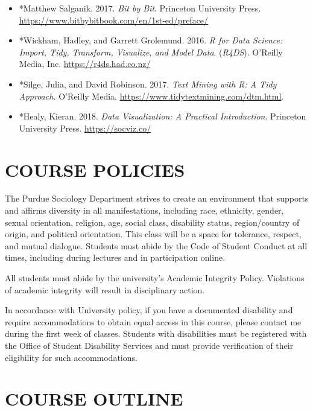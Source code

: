 \documentclass[
  10pt,
]{article}
\providecommand{\tightlist}{%
  \setlength{\itemsep}{0pt}\setlength{\parskip}{0pt}}
\begin{document}
\begin{itemize}
\tightlist
\item
  *Matthew Salganik. 2017. \emph{Bit by Bit}. Princeton University
  Press. \url{https://www.bitbybitbook.com/en/1st-ed/preface/}
\item
  *Wickham, Hadley, and Garrett Grolemund. 2016. \emph{R for Data
  Science: Import, Tidy, Transform, Visualize, and Model Data}.
  (\emph{R4DS}). O'Reilly Media, Inc. \url{https://r4ds.had.co.nz/}
\item
  *Silge, Julia, and David Robinson. 2017. \emph{Text Mining with R: A
  Tidy Approach.} O'Reilly Media.
  \url{https://www.tidytextmining.com/dtm.html}.
\item
  *Healy, Kieran. 2018. \emph{Data Visualization: A Practical
  Introduction}. Princeton University Press. \url{https://socviz.co/}
\end{itemize}

\hypertarget{course-policies}{%
\section{COURSE POLICIES}\label{course-policies}}

The Purdue Sociology Department strives to create an environment that
supports and affirms diversity in all manifestations, including race,
ethnicity, gender, sexual orientation, religion, age, social class,
disability status, region/country of origin, and political orientation.
This class will be a space for tolerance, respect, and mutual dialogue.
Students must abide by the Code of Student Conduct at all times,
including during lectures and in participation online.

All students must abide by the university's Academic Integrity Policy.
Violations of academic integrity will result in disciplinary action.

In accordance with University policy, if you have a documented
disability and require accommodations to obtain equal access in this
course, please contact me during the first week of classes. Students
with disabilities must be registered with the Office of Student
Disability Services and must provide verification of their eligibility
for such accommodations.

\hypertarget{course-outline}{%
\section{COURSE OUTLINE}\label{course-outline}}
\end{document}
